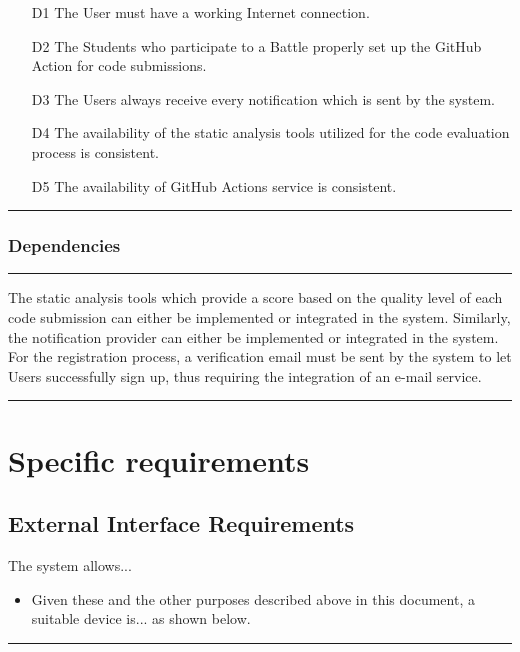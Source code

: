 \documentclass{Configuration_Files/Template}
\begin{document}
\begin{enumerate}
    \item[\textcolor{bluepoli}{D1}] The User must have a working Internet connection.
    \item[\textcolor{bluepoli}{D2}] The Students who participate to a Battle properly set up the GitHub Action for code submissions.
    \item[\textcolor{bluepoli}{D3}] The Users always receive every notification which is sent by the system.
    \item[\textcolor{bluepoli}{D4}] The availability of the static analysis tools utilized for the code evaluation process is consistent.
    \item[\textcolor{bluepoli}{D5}] The availability of GitHub Actions service is consistent.
\end{enumerate}

{\color{bluepoli}\rule{\linewidth}{0.1pt}}

\subsection{Dependencies}

{\color{bluepoli}\rule{\linewidth}{0.1pt}}

The static analysis tools which provide a score based on the quality level of each code submission can either be implemented or integrated in the system. Similarly, the notification provider can either be implemented or integrated in the system. For the registration process, a verification email must be sent by the system to let Users successfully sign up, thus requiring the integration of an e-mail service.

{\color{bluepoli}\rule{\linewidth}{0.1pt}}


\chapter{Specific requirements}

\section{External Interface Requirements}

The system allows...

\begin{itemize}
\item Given these and the other purposes described above in this document, a suitable device is... as shown below.\\
\end{itemize}
{\color{bluepoli}\rule{\linewidth}{0.1pt}}
\end{document}

